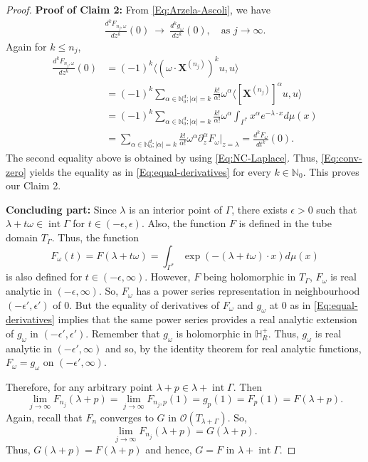 \documentclass[10pt,a4paper]{amsart}
\begin{document}
\begin{proof}
\noindent \textbf{Proof of Claim 2:} From \eqref{Eq:Arzela-Ascoli}, we have
\begin{align}\label{Eq:conv-zero}
    \frac{d^k F_{n_j, \omega}}{dz^k}(0) \  \rightarrow \ \frac{d^k g_\omega} {dz^k}(0), \quad \text{as } j\to \infty.
\end{align}
Again for $k \leq n_j$,
\begin{align*}
    \frac{d^k F_{n_j, \omega}}{dz^k}(0) &= (-1)^k \langle (\omega \cdot \boldsymbol{X}^{(n_j)} )^k u, u \rangle  \\
    &= (-1)^k \sum_{\alpha \in \mathbb{N}_0^d; |\alpha|=k} \frac{k!}{\alpha!}\omega^\alpha \langle  [\boldsymbol{X}^{(n_j)} ]^\alpha u, u \rangle \\
    &=(-1)^k \sum_{\alpha \in \mathbb{N}_0^d; |\alpha|=k} \frac{k!}{\alpha!}\omega^\alpha \int_{\Gamma^*} x^\alpha e^{-\lambda \cdot x} d\mu(x) \\
    &= \sum_{\alpha \in \mathbb{N}_0^d; |\alpha|=k} \frac{k!}{\alpha!}\omega^\alpha \partial^\alpha_z F_\omega|_{z=\lambda}
    = \frac{d^k F_\omega}{dt^k}(0).
\end{align*}
The second equality above is obtained by using \eqref{Eq:NC-Laplace}.
Thus, \eqref{Eq:conv-zero} yields the equality as in \eqref{Eq:equal-derivatives} for every $k\in \mathbb{N}_0$. This proves our Claim 2.


\vspace{2mm}
\noindent \textbf{Concluding part:} Since $\lambda$ is an interior point of $\Gamma$, there exists $\epsilon > 0$ such that $\lambda + t\omega \in \operatorname{int} \Gamma$ for $t\in (-\epsilon, \epsilon)$. Also, the function $F$ is defined in the tube domain $T_\Gamma$. Thus, the function
$$
F_\omega(t) = F(\lambda + t\omega) = \int_{\Gamma^*} \exp(-(\lambda+ t\omega)\cdot x) d\mu(x)
$$
is also defined for $t\in (-\epsilon, \infty)$. However, $F$ being holomorphic in $T_\Gamma$, $F_\omega$ is real analytic in $(-\epsilon, \infty)$. So, $F_\omega$ has a power series representation in neighbourhood $(-\epsilon', \epsilon')$ of $0$. But the equality of derivatives of $F_\omega$ and $g_\omega$ at $0$ as in \eqref{Eq:equal-derivatives} implies that the same power series provides a real analytic extension of $g_\omega$ in $(-\epsilon', \epsilon')$. Remember that $g_\omega$ is holomorphic in $\mathbb{H}^+_R$. Thus, $g_\omega$ is real analytic in $(-\epsilon', \infty)$ and so, by the identity theorem for real analytic functions, $F_\omega = g_\omega$ on $(-\epsilon', \infty)$.

Therefore, for any arbitrary point $\lambda + p \in \lambda + \operatorname{int} \Gamma$. Then 
$$
\lim_{j\to \infty} F_{n_j}(\lambda + p) = \lim_{j\to \infty} F_{n_j, p} (1) = g_p(1) = F_p(1)=F(\lambda +p).
$$
Again, recall that $F_n$ converges to $G$ in $\mathcal{O}(T_{\lambda + \Gamma})$. So, 
$$
\lim_{j\to \infty} F_{n_j}(\lambda + p) = G(\lambda + p).
$$
Thus, $G(\lambda + p)=F(\lambda + p)$ and hence, $G=F$ in $\lambda + \operatorname{int} \Gamma$.  


\end{proof}
\end{document}
